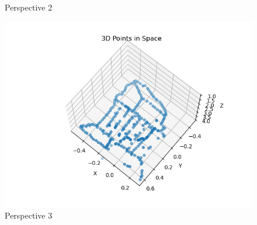 \begin{figure}[H]
\begin{minipage}{.49\textwidth}
    \caption*{Perspective 2}
  \end{minipage}
  \hfill
  \begin{minipage}{.49\textwidth}
    \centering
    \includegraphics[width=\textwidth]{./figures/sparse-3.png}
    \caption*{Perspective 3}
  \end{minipage}
\end{figure}
